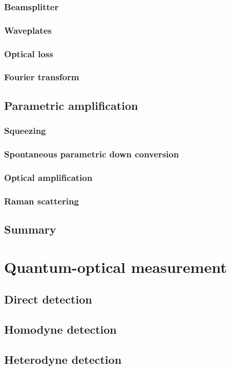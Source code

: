 \documentclass{book}
\begin{document}
\subsection{Beamsplitter}
\subsection{Waveplates}
\subsection{Optical loss}
\subsection{Fourier transform}
\section{Parametric amplification}
\subsection{Squeezing}
\subsection{Spontaneous parametric down conversion}
\subsection{Optical amplification}
\subsection{Raman scattering}
\section{Summary}

\chapter{Quantum-optical measurement}
\section{Direct detection}
\section{Homodyne detection}
\section{Heterodyne detection}
\end{document}
